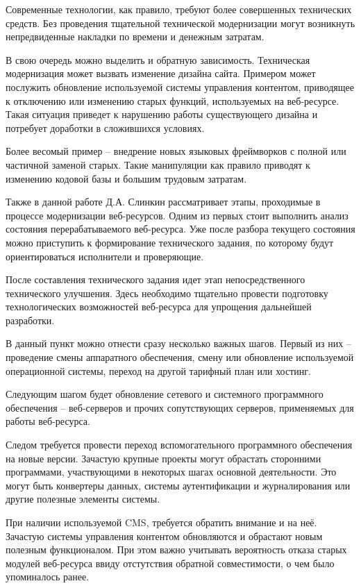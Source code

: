 Современные технологии, как правило, требуют более совершенных технических средств.
Без проведения тщательной технической модернизации могут возникнуть непредвиденные накладки по времени и денежным затратам.

В свою очередь можно выделить и обратную зависимость.
Техническая модернизация может вызвать изменение дизайна сайта.
Примером может послужить обновление используемой системы управления контентом, приводящее к отключению или изменению старых функций, используемых на веб-ресурсе.
Такая ситуация приведет к нарушению работы существующего дизайна и потребует доработки в сложившихся условиях.

Более весомый пример -- внедрение новых языковых фреймворков с полной или частичной заменой старых.
Такие манипуляции как правило приводят к изменению кодовой базы и большим трудовым затратам. 

Также в данной работе Д.А. Слинкин рассматривает этапы, проходимые в процессе модернизации веб-ресурсов.
Одним из первых стоит выполнить анализ состояния перерабатываемого веб-ресурса.
Уже после разбора текущего состояния можно приступить к формирование технического задания, по которому будут ориентироваться исполнители и проверяющие.

После составления технического задания идет этап непосредственного технического улучшения.
Здесь необходимо тщательно провести подготовку технологических возможностей веб-ресурса для упрощения дальнейшей разработки.

В данный пункт можно отнести сразу несколько важных шагов.
Первый из них -- проведение смены аппаратного обеспечения, смену или обновление используемой операционной системы, переход на другой тарифный план или хостинг.

Следующим шагом будет обновление сетевого и системного программного обеспечения -- веб-серверов и прочих сопутствующих серверов, применяемых для работы веб-ресурса.

Следом требуется провести переход вспомогательного программного обеспечения на новые версии.
Зачастую крупные проекты могут обрастать сторонними программами, участвующими в некоторых шагах основной деятельности.
Это могут быть конвертеры данных, системы аутентификации и журналирования или другие полезные элементы системы.

При наличии используемой CMS, требуется обратить внимание и на неё.
Зачастую системы управления контентом обновляются и обрастают новым полезным функционалом.
При этом важно учитывать вероятность отказа старых модулей веб-ресурса ввиду отстутствия обратной совместимости, о чем было упоминалось ранее.


